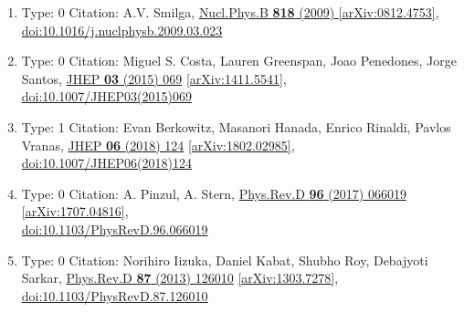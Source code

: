 \documentclass[a4paper,10pt]{article}
\begin{document}
\begin{enumerate}
\begin{enumerate}
  \item Type: 0 Citation: A.V. Smilga, \href{https://www.doi.org/10.1016/j.nuclphysb.2009.03.023}{Nucl.Phys.B {\bf 818} (2009) }  \href{https://arxiv.org/abs/0812.4753}{[arXiv:0812.4753]},\\\href{https://www.doi.org/10.1016/j.nuclphysb.2009.03.023}{doi:10.1016/j.nuclphysb.2009.03.023}
  \item Type: 0 Citation: Miguel S. Costa, Lauren Greenspan, Joao Penedones, Jorge Santos, \href{https://www.doi.org/10.1007/JHEP03(2015)069}{JHEP {\bf 03} (2015) 069}  \href{https://arxiv.org/abs/1411.5541}{[arXiv:1411.5541]},\\\href{https://www.doi.org/10.1007/JHEP03(2015)069}{doi:10.1007/JHEP03(2015)069}
  \item Type: 1 Citation: Evan Berkowitz, Masanori Hanada, Enrico Rinaldi, Pavlos Vranas, \href{https://www.doi.org/10.1007/JHEP06(2018)124}{JHEP {\bf 06} (2018) 124}  \href{https://arxiv.org/abs/1802.02985}{[arXiv:1802.02985]},\\\href{https://www.doi.org/10.1007/JHEP06(2018)124}{doi:10.1007/JHEP06(2018)124}
  \item Type: 0 Citation: A. Pinzul, A. Stern, \href{https://www.doi.org/10.1103/PhysRevD.96.066019}{Phys.Rev.D {\bf 96} (2017) 066019}  \href{https://arxiv.org/abs/1707.04816}{[arXiv:1707.04816]},\\\href{https://www.doi.org/10.1103/PhysRevD.96.066019}{doi:10.1103/PhysRevD.96.066019}
  \item Type: 0 Citation: Norihiro Iizuka, Daniel Kabat, Shubho Roy, Debajyoti Sarkar, \href{https://www.doi.org/10.1103/PhysRevD.87.126010}{Phys.Rev.D {\bf 87} (2013) 126010}  \href{https://arxiv.org/abs/1303.7278}{[arXiv:1303.7278]},\\\href{https://www.doi.org/10.1103/PhysRevD.87.126010}{doi:10.1103/PhysRevD.87.126010}

\end{enumerate}
\end{enumerate}
\end{document}
